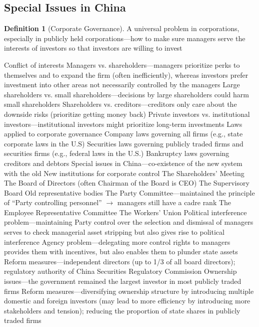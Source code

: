 \documentclass[11pt]{article}
\theoremstyle{definition}
\newtheorem{definition}{Definition}[section]
\theoremstyle{remark}
\begin{document}
\subsection{Special Issues in China}
\begin{definition}[Corporate Governance] A universal problem in corporations, especially in publicly held corporations---how to make sure managers serve the interests of investors so that investors are willing to invest
\begin{outline}[enumerate]
\1 Conflict of interests
	\2 Managers vs. shareholders---managers prioritize perks to themselves and to expand the firm (often inefficiently), whereas investors prefer investment into other areas not necessarily controlled by the managers
	\2 Large shareholders vs. small shareholders---decisions by large shareholders could harm small shareholders
	\2 Shareholders vs. creditors---creditors only care about the downside risks (prioritize getting money back)
	\2 Private investors vs. institutional investors---institutional investors might prioritize long-term investments
\1 Laws applied to corporate governance
	\2 Company laws governing all firms (e.g., state corporate laws in the U.S)
	\2 Securities laws governing publicly traded firms and securities firms (e.g., federal laws in the U.S.)
	\2 Bankruptcy laws governing creditors and debtors
\1 Special issues in China---co-existence of the new system with the old
	\2 New institutions for corporate control
		\3 The Shareholders' Meeting
		\3 The Board of Directors (often Chairman of the Board is CEO)
		\3 The Supervisory Board
	\2 Old representative bodies
		\3 The Party Committee---maintained the principle of ``Party controlling personnel'' $\to$ managers still have a cadre rank
		\3 The Employee Representative Committee
		\3 The Workers’ Union
	\2 Political interference problem---maintaining Party control over the selection and dismissal of managers serves to check managerial asset stripping but also gives rise to political interference
	\2 Agency problem---delegating more control rights to managers provides them with incentives, but also enables them to plunder state assets
		\3 Reform measures---independent directors (up to 1/3 of all board directors); regulatory authority of China Securities Regulatory Commission
	\2 Ownership issues---the government remained the largest investor in most publicly traded firms
		\3 Reform measures---diversifying ownership structure by introducing multiple domestic and foreign investors (may lead to more efficiency by introducing more stakeholders and tension); reducing the proportion of state shares in publicly traded firms
\end{outline}
\end{definition}
\end{document}
